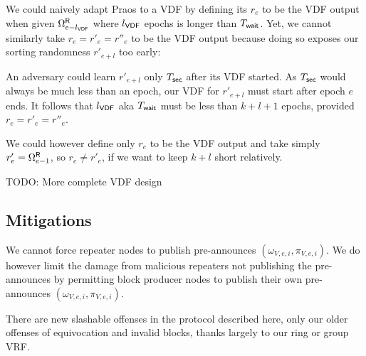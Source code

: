 We could naively adapt Praos to a VDF by defining its $r_e$ to be the VDF output when given $\Omega^{\mathsf{R}}_{e-l_{\mathsf{VDF}}}$ where $l_{\mathsf{VDF}}$ epochs is longer than $T_{\mathsf{wait}}$.  Yet, we cannot similarly take $r_e = r'_e = r''_e$ to be the VDF output because doing so exposes our sorting randomness $r'_{e+l}$ too early: 

An adversary could learn $r'_{e+l}$ only $T_{\mathsf{sec}}$ after its VDF started.  As $T_{\mathsf{sec}}$ would always be much less than an epoch, our VDF for $r'_{e+l}$ must start after epoch $e$ ends.  It follows that $l_{\mathsf{VDF}}$ aka $T_{\mathsf{wait}}$ must be less than $k+l+1$ epochs, provided $r_e = r'_e = r''_e$.  

We could however define only $r_e$ to be the VDF output and take simply $r'_e = \Omega^{\mathsf{R}}_{e-1}$, so $r_e \ne r'_e$, if we want to keep $k+l$ short relatively.  

TODO: More complete VDF design


\subsection{Mitigations}\label{subsec:slashing}

We cannot force repeater nodes to publish pre-announces $(\omega_{V,e,i},\pi_{V,e,i})$.  We do however limit the damage from malicious repeaters not publishing the pre-announces by permitting block producer nodes to publish their own pre-announces $(\omega_{V,e,i},\pi_{V,e,i})$.  

There are new slashable offenses in the protocol described here, only our older offenses of equivocation and invalid blocks, thanks largely to our ring or group VRF.  







